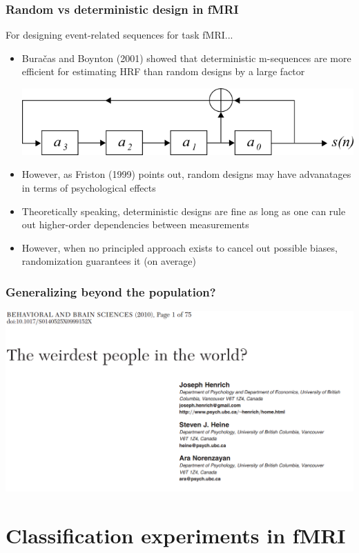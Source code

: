 \documentclass{beamer}
\begin{document}
\begin{frame}
\frametitle{Random vs deterministic design in fMRI}
For designing event-related sequences for task fMRI...
\begin{itemize}
\item Bura\v{c}as and Boynton (2001) showed that deterministic m-sequences are more efficient for estimating HRF than random designs by a large factor
\begin{center}
\includegraphics[scale = 0.2]{MLS_shiftregisters_L4.png}
\end{center}
\item However, as Friston (1999) points out, random designs may have advanatages in terms of psychological effects
\item Theoretically speaking, deterministic designs are fine as long as one can rule out higher-order dependencies between measurements
\item However, when no principled approach exists to cancel out possible biases, randomization guarantees it (on average)
\end{itemize}
\end{frame}

\begin{frame}
\frametitle{Generalizing beyond the population?}
\begin{center}
\includegraphics[scale = 0.3]{weird_people.png}
\end{center}
\end{frame}


\section{Classification experiments in fMRI}
\end{document}
